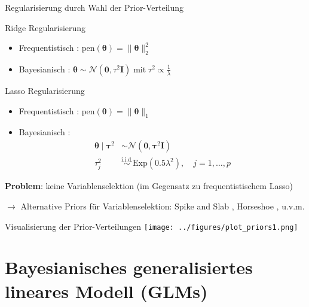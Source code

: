 \documentclass[
  ignorenonframetext,
  aspectratio=169,
]{beamer}
\newcommand{\bnull}{\bm{0}}
\newcommand{\bI}{\bm{I}}
\newcommand{\Ncal}{\mathcal{N}}
\newcommand{\btheta}{\bm{\theta}}
\newcommand{\btaus}{\bm{\tau}^2}
\newcommand{\taus}{\tau^2}
\begin{document}
\begin{frame}{Regularisierung durch Wahl der Prior-Verteilung}
\protect{}\label{regularisierung-durch-wahl-der-prior-verteilung}
\begin{block}{Ridge Regularisierung}
\protect{}\label{ridge-regularisierung}
\begin{itemize}
\item
  Frequentistisch \autocite{hoerl_ridge_1970,hoerl_ridge_1970-1}:
  \(\text{pen}(\btheta) = \|\btheta\|_2^2\)
\item
  Bayesianisch \autocite{mackay_bayesian_1992}:
  \(\btheta \sim \Ncal(\bnull, \taus \bI) \; \text{mit} \; \taus \propto \frac{1}{\lambda}\)
\end{itemize}
\end{block}

\begin{block}{Lasso Regularisierung}
\protect{}\label{lasso-regularisierung}
\begin{itemize}
\item
  Frequentistisch \autocite{tibshirani_regression_1996}:
  \(\text{pen}(\btheta) = \|\btheta\|_1\)
\item
  Bayesianisch \autocite{park_bayesian_2008}: \[
  \begin{aligned}
  \btheta \mid \btaus &\sim \Ncal(\bnull, \btaus \bI) \\
  \taus_j &\overset{\text{i.i.d.}}{\sim} \text{Exp}(0.5 \lambda^2), \quad j = 1, \dots, p
  \end{aligned}
  \]
\end{itemize}
\end{block}

\textbf{Problem}: keine Variablenselektion (im Gegensatz zu
frequentistischem Lasso)

\(\to\) Alternative Priors für Variablenselektion: Spike and Slab
\autocite{mitchell_bayesian_1988}, Horseshoe
\autocite{carvalho_horseshoe_2010}, u.v.m.
\end{frame}

\begin{frame}{Visualisierung der Prior-Verteilungen}
\protect{}\label{visualisierung-der-prior-verteilungen}
\texttt{[image: ../figures/plot\_priors1.png]}
\end{frame}

\section{\texorpdfstring{Bayesianisches \textbf{generalisiertes}
lineares Modell
(GLMs)}{Bayesianisches generalisiertes lineares Modell (GLMs)}}\label{bayesianisches-generalisiertes-lineares-modell-glms}
\end{document}
